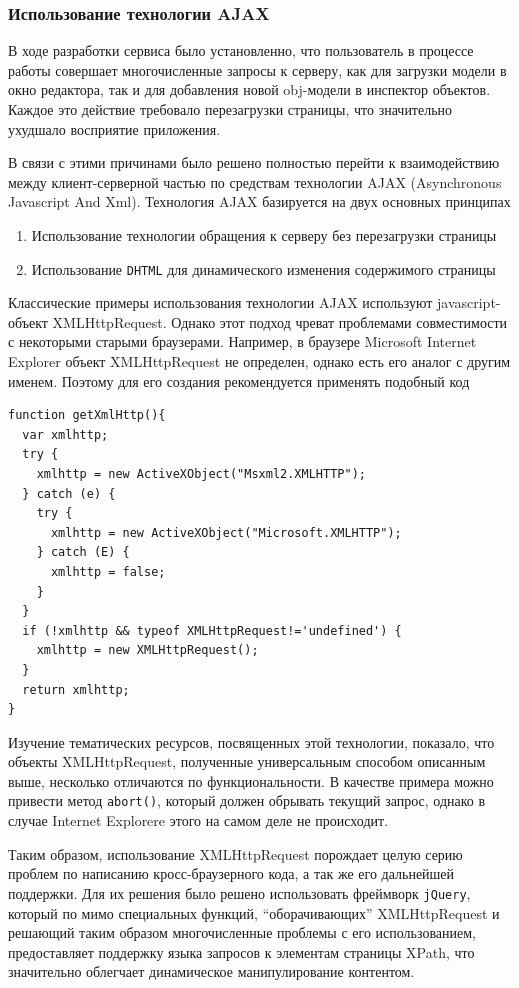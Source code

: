 \documentclass[12pt, a4paper]{article}
\begin{document}
\subsubsection{Использование технологии AJAX}
В ходе разработки сервиса было установленно, что пользователь в процессе работы
совершает многочисленные запросы к серверу, как для загрузки модели в окно
редактора, так и для добавления новой obj-модели в инспектор объектов. Каждое
это действие требовало перезагрузки страницы, что значительно ухудшало
восприятие приложения.

В связи с этими причинами было решено полностью перейти к взаимодействию между
клиент-серверной частью по средствам технологии AJAX (Asynchronous Javascript
And Xml). Технология AJAX базируется на двух основных принципах
\begin{enumerate}
    \item Использование технологии обращения к серверу без перезагрузки страницы
    \item Использование \texttt{DHTML} для динамического изменения содержимого
    страницы
\end{enumerate}

Классические примеры использования технологии AJAX используют javascript-объект
XMLHttpRequest. Однако этот подход чреват проблемами совместимости с некоторыми
старыми браузерами. Например, в браузере Microsoft Internet Explorer объект
XMLHttpRequest не определен, однако есть его аналог с другим именем. Поэтому для
его создания рекомендуется применять подобный код
\begin{lstlisting}
function getXmlHttp(){
  var xmlhttp;
  try {
    xmlhttp = new ActiveXObject("Msxml2.XMLHTTP");
  } catch (e) {
    try {
      xmlhttp = new ActiveXObject("Microsoft.XMLHTTP");
    } catch (E) {
      xmlhttp = false;
    }
  }
  if (!xmlhttp && typeof XMLHttpRequest!='undefined') {
    xmlhttp = new XMLHttpRequest();
  }
  return xmlhttp;
}
\end{lstlisting}
Изучение тематических ресурсов, посвященных этой технологии, показало, что
объекты XMLHttpRequest, полученные универсальным способом описанным выше,
несколько отличаются по функциональности. В качестве примера можно привести
метод \texttt{abort()}, который должен обрывать текущий запрос, однако в случае
Internet Explorere этого на самом деле не происходит.

Таким образом, использование XMLHttpRequest порождает целую серию проблем по
написанию кросс-браузерного кода, а так же его дальнейшей поддержки. Для их
решения было решено использовать фреймворк \texttt{jQuery}, который по мимо
специальных функций, ``оборачивающих'' XMLHttpRequest и решающий таким образом
многочисленные проблемы с его использованием, предоставляет поддержку языка
запросов к элементам страницы XPath, что значительно облегчает динамическое
манипулирование контентом.
\end{document}
